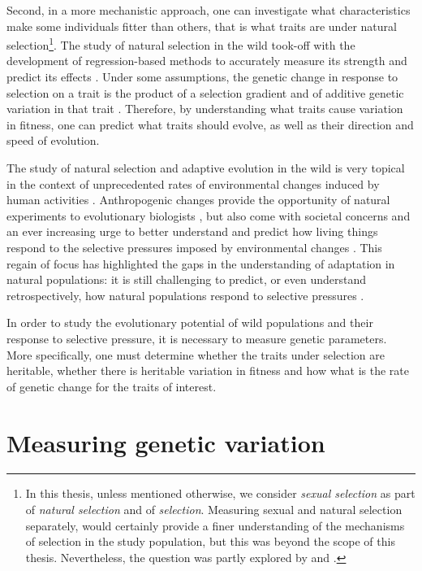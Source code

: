 Second, in a more mechanistic approach, one can investigate what characteristics make some individuals fitter than others, that is what traits are under natural selection\footnote{In this thesis, unless mentioned otherwise, we consider \emph{sexual selection} as part of \emph{natural selection} and of \emph{selection}. Measuring sexual and natural selection separately, would certainly provide a finer understanding of the mechanisms of selection in the study population, but this was beyond the scope of this thesis. Nevertheless, the question was partly explored by \cite{Garcia-Navas2016} and \cite{Garcia-Navas2015a}.}. The study of natural selection in the wild took-off with the development of regression-based methods to accurately measure its strength and predict its effects \parencite{Lande1979, Lande1983}. Under some assumptions, the genetic change in response to selection on a trait is the product of a selection gradient and of additive genetic variation in that trait \parencite{Lush1937}. Therefore, by understanding what traits cause variation in fitness, one can predict what traits should evolve, as well as their direction and speed of evolution. 

The study of natural selection and adaptive evolution in the wild is very topical in the context of unprecedented rates of environmental changes induced by human activities \parencite{parmesan2006}. Anthropogenic changes provide the opportunity of natural experiments to evolutionary biologists \parencite{Altermatt2016, Brookfield2016}, but also come with societal concerns and an ever increasing urge to better understand and predict how living things respond to the selective pressures imposed by environmental changes \parencite{McCarty2001, Shaw2013}. This regain of focus has highlighted the gaps in the understanding of adaptation in natural populations: it is still challenging to predict, or even understand retrospectively, how natural populations respond to selective pressures \parencite{Merila2001, Tafani2013, Shaw2013, Brookfield2016}.

In order to study the evolutionary potential of wild populations and their response to selective pressure, it is necessary to measure genetic parameters. More specifically, one must determine whether the traits under selection are heritable, whether there is heritable variation in fitness and how what is the rate of genetic change for the traits of interest. 

\section{Measuring genetic variation}
